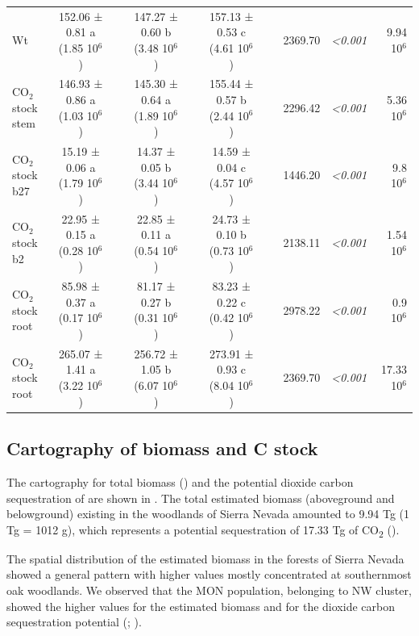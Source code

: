 \begin{table}
\begin{adjustbox}{width=\linewidth}
\begin{threeparttable}
\begin{tabular}{lclclclrrr}
Wt & 152.06 ± 0.81 a (1.85 10$^6$) & ~ & 147.27 ± 0.60 b (3.48 10$^6$) & ~ & 157.13 ± 0.53 c (4.61 10$^6$) & ~ & 2369.70 & \textit{\textless{}0.001} & 9.94 10$^6$ \\
CO$_2$ stock stem & 146.93 ± 0.86 a (1.03 10$^6$) & ~ & 145.30 ± 0.64 a (1.89 10$^6$) & ~ & 155.44 ± 0.57 b (2.44 10$^6$) & ~ & 2296.42 & \textit{\textless{}0.001} & 5.36 10$^6$ \\
CO$_2$ stock b27 & 15.19 ± 0.06 a (1.79 10$^6$) & ~ & 14.37 ± 0.05 b (3.44 10$^6$) & ~ & 14.59 ± 0.04 c (4.57 10$^6$) & ~ & 1446.20 & \textit{\textless{}0.001} & 9.8 10$^6$ \\
CO$_2$ stock b2 & 22.95 ± 0.15 a (0.28 10$^6$) & ~ & 22.85 ± 0.11 a (0.54 10$^6$) & ~ & 24.73 ± 0.10 b (0.73 10$^6$) & ~ & 2138.11 & \textit{\textless{}0.001} & 1.54 10$^6$ \\
CO$_2$ stock root & 85.98 ± 0.37 a (0.17 10$^6$) & ~ & 81.17 ± 0.27 b (0.31 10$^6$) & ~ & 83.23 ± 0.22 c (0.42 10$^6$) & ~ & 2978.22 & \textit{\textless{}0.001} & 0.9 10$^6$ \\
CO$_2$ stock root & 265.07 ± 1.41 a (3.22 10$^6$) & ~ & 256.72 ± 1.05 b (6.07 10$^6$) & ~ & 273.91 ± 0.93 c (8.04 10$^6$) & ~ & 2369.70 & \textit{\textless{}0.001} & 17.33 10$^6$ \\
\bottomrule
\end{tabular}
	\end{threeparttable}
\end{adjustbox}
\end{table}

\subsection{Cartography of biomass and C stock}\label{sec:carbon:results-cartography}
The cartography for total biomass (\wt) and the potential dioxide carbon sequestration of are shown in . The total estimated biomass (aboveground and belowground) existing in the \Qp woodlands of Sierra Nevada amounted to 9.94 Tg (1 Tg = 1012 g), which represents a potential sequestration of 17.33 Tg of CO\textsubscript{2} ().

The spatial distribution of the estimated biomass in the \Qp forests of Sierra Nevada showed a general pattern with higher values mostly concentrated at southernmost oak woodlands. We observed that the MON population, belonging to NW cluster, showed the higher values for the estimated biomass and for the dioxide carbon sequestration potential (; ).


